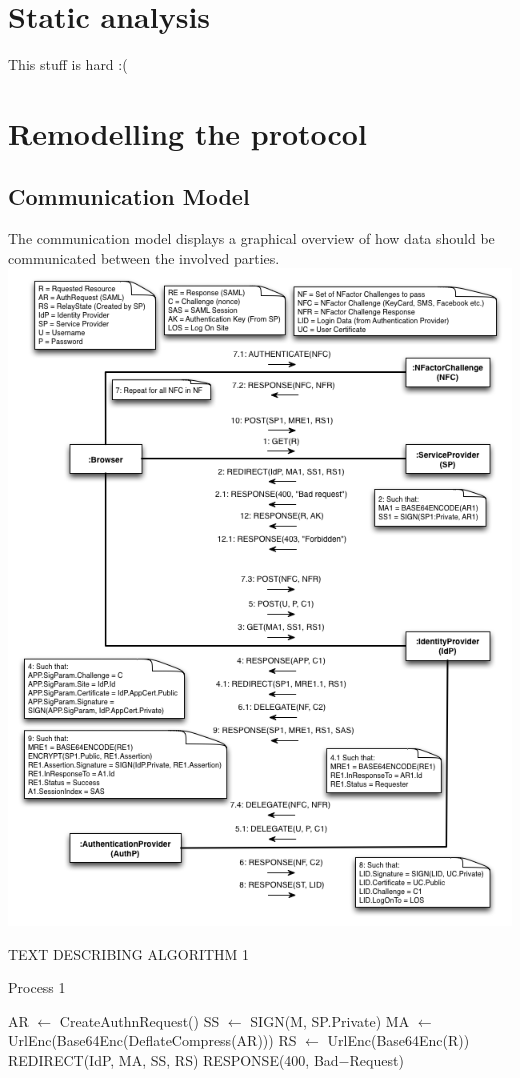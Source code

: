 \documentclass[twosided]{report}
\begin{document}
\chapter{Static analysis}
This stuff is hard :(


\chapter{Remodelling the protocol}

\section{Communication Model}
The communication model displays a graphical overview of how data should be communicated between the involved parties.
\newpage
\includegraphics[]{images/Communication.png}

TEXT DESCRIBING ALGORITHM 1
\begin{algorithm}[H]
	\caption{Process 1}
	\begin{algorithmic}
		\STATE AR $\leftarrow$ CreateAuthnRequest()
		\STATE SS $\leftarrow$ SIGN(M, SP.Private)
		\STATE MA $\leftarrow$ UrlEnc(Base64Enc(DeflateCompress(AR)))
		\STATE RS $\leftarrow$ UrlEnc(Base64Enc(R))
		\RETURN REDIRECT(IdP, MA, SS, RS)
	\ELSE
		\RETURN RESPONSE(400, Bad−Request)
	\ENDIF
	\end{algorithmic}
\end{algorithm}
\end{document}
